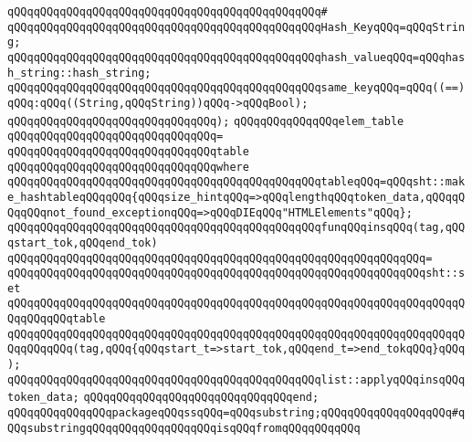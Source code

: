 \verb|qQQqqQQqqQQqqQQqqQQqqQQqqQQqqQQqqQQqqQQqqQQqqQQq#|\newline
\verb|qQQqqQQqqQQqqQQqqQQqqQQqqQQqqQQqqQQqqQQqqQQqqQQqHash_KeyqQQq=qQQqString;|\newline
\newline
\verb|qQQqqQQqqQQqqQQqqQQqqQQqqQQqqQQqqQQqqQQqqQQqqQQqhash_valueqQQq=qQQqhash_string::hash_string;|\newline
\newline
\verb|qQQqqQQqqQQqqQQqqQQqqQQqqQQqqQQqqQQqqQQqqQQqqQQqsame_keyqQQq=qQQq((==)qQQq:qQQq((String,qQQqString))qQQq->qQQqBool);|\newline
\verb|qQQqqQQqqQQqqQQqqQQqqQQqqQQqqQQq);|\newline
\newline
\verb|qQQqqQQqqQQqqQQqelem_table|\newline
\verb|qQQqqQQqqQQqqQQqqQQqqQQqqQQqqQQq=|\newline
\verb|qQQqqQQqqQQqqQQqqQQqqQQqqQQqqQQqtable|\newline
\verb|qQQqqQQqqQQqqQQqqQQqqQQqqQQqqQQqwhere|\newline
\verb|qQQqqQQqqQQqqQQqqQQqqQQqqQQqqQQqqQQqqQQqqQQqqQQqtableqQQq=qQQqsht::make_hashtableqQQqqQQq{qQQqsize_hintqQQq=>qQQqlengthqQQqtoken_data,qQQqqQQqqQQqnot_found_exceptionqQQq=>qQQqDIEqQQq"HTMLElements"qQQq};|\newline
\newline
\verb|qQQqqQQqqQQqqQQqqQQqqQQqqQQqqQQqqQQqqQQqqQQqqQQqfunqQQqinsqQQq(tag,qQQqstart_tok,qQQqend_tok)|\newline
\verb|qQQqqQQqqQQqqQQqqQQqqQQqqQQqqQQqqQQqqQQqqQQqqQQqqQQqqQQqqQQqqQQq=|\newline
\verb|qQQqqQQqqQQqqQQqqQQqqQQqqQQqqQQqqQQqqQQqqQQqqQQqqQQqqQQqqQQqqQQqsht::set|\newline
\verb|qQQqqQQqqQQqqQQqqQQqqQQqqQQqqQQqqQQqqQQqqQQqqQQqqQQqqQQqqQQqqQQqqQQqqQQqqQQqqQQqtable|\newline
\verb|qQQqqQQqqQQqqQQqqQQqqQQqqQQqqQQqqQQqqQQqqQQqqQQqqQQqqQQqqQQqqQQqqQQqqQQqqQQqqQQq(tag,qQQq{qQQqstart_t=>start_tok,qQQqend_t=>end_tokqQQq}qQQq);|\newline
\newline
\verb|qQQqqQQqqQQqqQQqqQQqqQQqqQQqqQQqqQQqqQQqqQQqqQQqlist::applyqQQqinsqQQqtoken_data;|\newline
\verb|qQQqqQQqqQQqqQQqqQQqqQQqqQQqqQQqend;|\newline
\newline
\verb|qQQqqQQqqQQqqQQqpackageqQQqssqQQq=qQQqsubstring;qQQqqQQqqQQqqQQqqQQq#qQQqsubstringqQQqqQQqqQQqqQQqqQQqisqQQqfromqQQqqQQqqQQq|\newline
